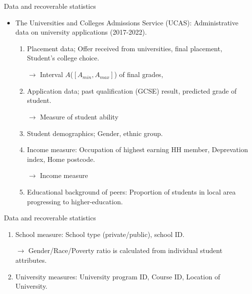 \begin{frame}{Data and recoverable statistics}
    \begin{itemize}
        \item The Universities and Colleges Admissions Service (UCAS): Administrative data on university applications (2017-2022).
\begin{enumerate}
    \item Placement data; Offer received from universities, final placement, Student's college choice.

    $\rightarrow$ \color{red} Interval $
    \hat{A}$\equiv ($[A_{min}, A_{max}]$) of final grades, \color{black}


    \item Application data;  past qualification (GCSE) result, predicted grade of student.
    
    $\rightarrow$ \color{red} Measure of student ability  \color{black}
    
    \item Student demographics; Gender, ethnic group.

    \item Income measure: Occupation of highest earning HH member, Deprevation index, Home postcode.

    $\rightarrow$ \color{red} Income measure \color{black}

    \item Educational background of peers: Proportion of students in local area progressing to higher-education.
\end{enumerate}
    \end{itemize}
\end{frame}

\begin{frame}{Data and recoverable statistics}
    \begin{enumerate}
    \item School measure: School type (private/public), school ID.

    $\rightarrow$ \color{red} Gender/Race/Poverty ratio is calculated from individual student attributes. \color{black}

    \item University measures: University program ID, Course ID, Location of University.
    \end{enumerate}
\end{frame}